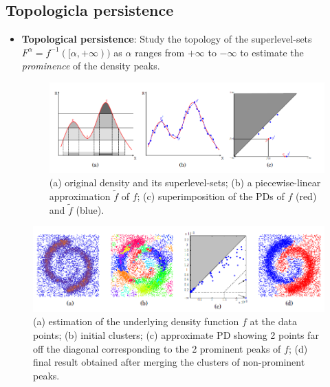 \documentclass{beamer}
\theoremstyle{definition}
\begin{document}
\subsection{Topologicla persistence}
\begin{frame}
\begin{itemize}
\item \textbf{Topological persistence}: Study the topology of the superlevel-sets $F^{\alpha} = f^{-1}([\alpha,+\infty))$ as $\alpha$ ranges from $+\infty$ to $-\infty$ to estimate the \emph{prominence} of the density peaks. %
\begin{figure}
\includegraphics[scale=0.6]{density}
\caption{(a) original density and its superlevel-sets; (b) a
piecewise-linear approximation $\tilde{f}$ of $f$; (c) superimposition of the PDs of $f$ (red) and $\tilde{f}$ (blue).} %
\end{figure}
\end{itemize}
\end{frame}

\begin{frame}
\begin{figure}
\includegraphics[scale=0.7]{ex}
\caption{(a) estimation of the underlying density function $f$ at the data points;
(b) initial clusters; (c) approximate PD showing 2 points far off the diagonal
corresponding to the 2 prominent peaks of $f$; (d) final result obtained after merging the clusters of
non-prominent peaks.}
\end{figure}
\end{frame}
\end{document}
